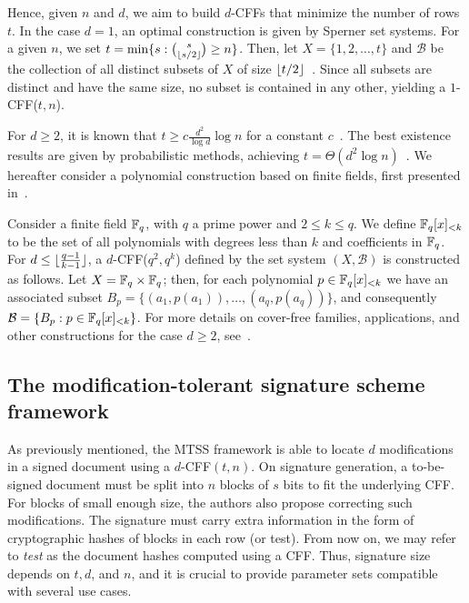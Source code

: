 \documentclass[12pt]{article}
\begin{document}
Hence, given $n$ and $d$, we aim to build $d$-CFFs that minimize the number of rows $t$. In the case $d = 1$, an optimal construction is given by Sperner set systems. For a given $n$, we set $t = \min \{s : \binom{s}{\lfloor s/2 \rfloor} \geq n\}$. Then, let $X = \{ 1, 2, \ldots, t\}$ and $\mathcal{B}$ be the collection of all distinct subsets of $X$ of size ${\lfloor t/2 \rfloor}$~\cite{sperner,Wei2006OnFamilies}. Since all subsets are distinct and have the same size, no subset is contained in any other, yielding a $1$-CFF($t,n$).


For $d \geq 2$, it is known that $t \geq c\frac{d^2}{\log d } \log n$ for a constant $c$~\cite{Furedi1996OnFamilies,Ruszinko1994OnFamilies,Wei2006OnFamilies}. The best existence results are given by probabilistic methods, achieving $t = \Theta(d^2 \log n)$~\cite{Bshouty2015LinearProblems, Gargano2020Low-weightApplications, Porat2011ExplicitSchemes, Rescigno2022BoundsAlgorithms}. We hereafter consider a polynomial construction based on finite fields, first presented in~\cite{erdos-1985}. 

Consider a finite field $\mathbb{F}_q$, with $q$ a prime power and $2 \leq k \leq q$. We define $\mathbb{F}_q[x]_{<k}$ to be the set of all polynomials with degrees less than $k$ and coefficients in $\mathbb{F}_q$. For $d \leq \lfloor \frac{q-1}{k-1} \rfloor$, a $d$-CFF($q^2, q^k$) defined by the set system $(X, \mathcal{B})$ is constructed as follows. Let $X = \mathbb{F}_q \times \mathbb{F}_q$; then, for each polynomial $p \in \mathbb{F}_q[x]_{<k}$ we have an associated subset $B_p = \{(a_1, p(a_1)), \dots, (a_q, p(a_q))\}$, and consequently $\mathcal{B} = \{B_p : p \in \mathbb{F}_q[x]_{<k}\}$. For more details on cover-free families, applications, and other constructions for the case $d \geq 2$, see~\cite{survey-cffs}.

\subsection{The modification-tolerant signature scheme framework}
\label{sec:mtss}

As previously mentioned, the MTSS framework \cite{mtss-idalino-2019} is able to locate $d$ modifications in a signed document using a $d$-CFF$(t, n)$. On signature generation, a to-be-signed document must be split into $n$ blocks of $s$ bits to fit the underlying CFF. For blocks of small enough size, the authors also propose correcting such modifications. The signature must carry extra information in the form of cryptographic hashes of blocks in each row (or test). From now on, we may refer to \emph{test} as the document hashes computed using a CFF. Thus, signature size depends on $t, d$, and $n$, and it is crucial to provide parameter sets compatible with several use cases.
\end{document}
